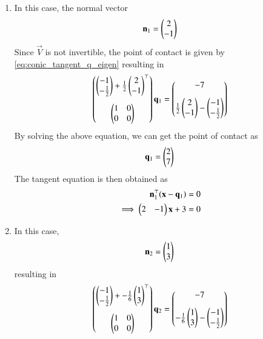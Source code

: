 \begin{enumerate}
	\item In this case,  the normal vector
		\begin{align}\mathbf{n}_1 = \begin{pmatrix}2 \\ -1\end{pmatrix}\end{align}
			Since 
$\vec{V}$ is not invertible,  
	the point of contact is given by 
\eqref{eq:conic_tangent_q_eigen} resulting in 
\begin{align}
\myvec{\myvec{-1 \\ -\frac{1}{2}} + \frac{1}{2}\myvec{2 \\ -1}^{\top} \vspace{0.3cm}\\ \myvec{
	1 & 0\\
	0 & 0\\
	}} \vec{q}_1 = \myvec{-7 \vspace{0.3cm}\\ \frac{1}{2}\myvec{2 \\ -1} - \myvec{-1 \\ -\frac{1}{2}}}
\end{align}
By solving the above equation, we can get the point of contact as
    \begin{align}
  \mathbf{q}_1=\begin{pmatrix}
	2 \\
	7 \\
	\end{pmatrix}
\end{align}
The 
tangent equation is then obtained as
\begin{align}
      \mathbf{n}_1^{\top}(\mathbf{x}-\mathbf{q}_1) = 0
  \\
	\implies  \begin{pmatrix}2 & -1\end{pmatrix}\mathbf{x}+3 = 0
\end{align}
\item 
In this case, 
		\begin{align}\mathbf{n}_2 = \begin{pmatrix}1 \\ 3\end{pmatrix} \end{align}
resulting in 
\begin{align}
\myvec{\myvec{-1 \\ -\frac{1}{2}} + -\frac{1}{6}\myvec{1 \\ 3}^{\top} \vspace{0.3cm}\\ \myvec{
	1 & 0\\
	0 & 0\\
	}} \vec{q}_2 = \myvec{-7 \vspace{0.3cm}\\ -\frac{1}{6}\myvec{1 \\ 3} - \myvec{-1 \\ -\frac{1}{2}}}

\end{align}
\end{enumerate}
